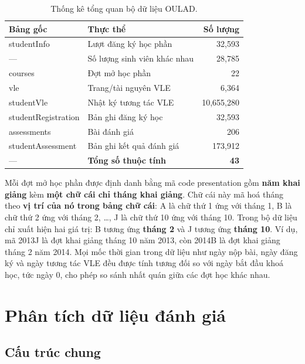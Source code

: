 \documentclass[a4paper]{report}
\newcommand{\code}[1]{{\ttfamily\def\_{\textunderscore\discretionary{}{}{}}#1}}
\def\code#1{#1}%
\def\_{ }%
\begin{document}
\begin{table}[H]
  \centering
  \caption{Thống kê tổng quan bộ dữ liệu OULAD.}
  \label{tab:overview}
  \begin{tabular}{llr}
    \toprule
    \textbf{Bảng gốc} & \textbf{Thực thể} & \textbf{Số lượng} \\
    \midrule
    \code{studentInfo}         & Lượt đăng ký học phần       & 32{,}593 \\
    ---                        & Số lượng sinh viên khác nhau & 28{,}785 \\
    \code{courses}             & Đợt mở học phần             & 22 \\
    \code{vle}                 & Trang/tài nguyên VLE        & 6{,}364 \\
    \code{studentVle}          & Nhật ký tương tác VLE       & 10{,}655{,}280 \\
    \code{studentRegistration} & Bản ghi đăng ký học         & 32{,}593 \\
    \code{assessments}         & Bài đánh giá                & 206 \\
    \code{studentAssessment}   & Bản ghi kết quả đánh giá    & 173{,}912 \\
    ---                        & \textbf{Tổng số thuộc tính} & \textbf{43} \\
    \bottomrule
  \end{tabular}
\end{table}

Mỗi đợt mở học phần được định danh bằng mã \code{code\_presentation} gồm
\textbf{năm khai giảng} kèm \textbf{một chữ cái chỉ tháng khai giảng}. Chữ cái
này mã hoá tháng theo \textbf{vị trí của nó trong bảng chữ cái}: A là chữ thứ 1
ứng với tháng 1, B là chữ thứ 2 ứng với tháng 2, \ldots, J là chữ thứ 10 ứng với
tháng 10. Trong bộ dữ liệu chỉ xuất hiện hai giá trị: \code{B} tương ứng
\textbf{tháng 2} và \code{J} tương ứng \textbf{tháng 10}. Ví dụ, mã
\code{2013J} là đợt khai giảng tháng 10 năm 2013, còn \code{2014B} là đợt khai
giảng tháng 2 năm 2014. Mọi mốc thời gian trong dữ liệu như ngày nộp bài, ngày
đăng ký và ngày tương tác VLE đều được tính tương đối so với ngày bắt đầu khoá
học, tức ngày 0, cho phép so sánh nhất quán giữa các đợt học khác nhau.

\section{Phân tích dữ liệu đánh giá}

\subsection{Cấu trúc chung}
\end{document}
